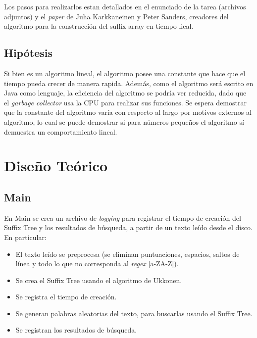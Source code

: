 \documentclass[letterpaper,10pt]{article}
\begin{document}
	Los pasos para realizarlos estan detallados en el enunciado de la tarea (archivos adjuntos) y el \textit{paper} de Juha Karkkaneinen y Peter Sanders, creadores del algoritmo para la construcción del suffix array en tiempo lieal.

	\subsection{Hipótesis}

	Si bien es un algoritmo lineal, el algoritmo posee una constante que hace que el tiempo pueda crecer de manera rapida. Además, como el algoritmo será escrito en Java como lenguaje,
	la eficiencia del algoritmo se podría ver reducida, dado que el \textit{garbage collector} usa la CPU para realizar sus funciones. Se espera demostrar que la constante del algoritmo
	varía con respecto al largo por motivos externos al algoritmo, lo cual se puede demostrar si para números pequeños el algoritmo sí demuestra un comportamiento lineal.

	\newpage

	\section{Diseño Teórico}

	\subsection{Main}

	En Main se crea un archivo de \textit{logging} para registrar el tiempo de creación del Suffix Tree y los resultados de búsqueda, a partir de un texto leído desde el disco.
	En particular:
	\begin{itemize}
		\item El texto leído se preprocesa (se eliminan puntuaciones, espacios, saltos de línea y todo lo que no corresponda al \textit{regex} [a-ZA-Z]).
		\item Se crea el Suffix Tree usando el algoritmo de Ukkonen.
		\item Se registra el tiempo de creación.
		\item Se generan palabras aleatorias del texto, para buscarlas usando el Suffix Tree.
		\item Se registran los resultados de búsqueda.
	\end{itemize}
\end{document}
